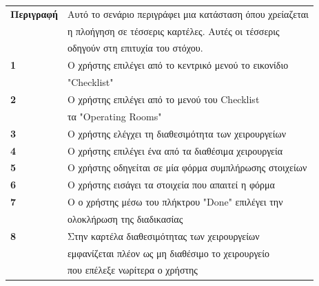 \documentclass{article}
\newcommand\T{\rule{0pt}{2.6ex}}       %
\newcommand\B{\rule[-1.2ex]{0pt}{0pt}}
\begin{document}
 \begin{center}
     \begin{tabular}{|l|l|}
     \hline
      \textbf{Περιγραφή }   & Αυτό το σενάριο περιγράφει μια κατάσταση όπου χρείαζεται\\& η πλοήγηση σε τέσσερις καρτέλες. Αυτές οι τέσσερις\\& οδηγούν στη επιτυχία του στόχου. \T\B \\ 
      \hline
      \textbf{1} & Ο χρήστης επιλέγει από το κεντρικό μενού το εικονίδιο\\& "Checklist" \T\B \\
      \hline
      \textbf{2} & Ο χρήστης επιλέγει από το μενού του Checklist\\& τα "Operating Rooms" \T\B \\
      \hline
      \textbf{3} & Ο χρήστης ελέγχει τη διαθεσιμότητα των χειρουργείων \T\B \\
      \hline
      \textbf{4} & Ο χρήστης επιλέγει ένα από τα διαθέσιμα χειρουργεία \T\B \\
      \hline
      \textbf{5} & Ο χρήστης οδηγείται σε μία φόρμα συμπλήρωσης στοιχείων \T\B \\
      \hline
      \textbf{6} & Ο χρήστης εισάγει τα στοιχεία που απαιτεί η φόρμα\T\B \\
      \hline
      \textbf{7} & Ο ο χρήστης μέσω του πλήκτρου "Done" επιλέγει την\\& ολοκλήρωση της διαδικασίας \T\B \\
      \hline
      \textbf{8} & Στην καρτέλα διαθεσιμότητας των χειρουργείων\\& εμφανίζεται πλέον ως μη διαθέσιμο το χειρουργείο\\& που επέλεξε νωρίτερα ο χρήστης \T\B \\
      \hline
     \end{tabular}
 \end{center}
\end{document}
